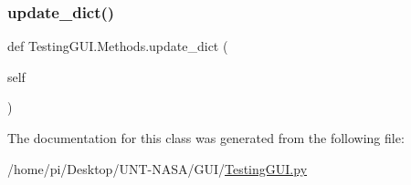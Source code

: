 \mbox{\label{classTestingGUI_1_1Methods_a0709231f5f6f33c59ce325c7e3ebf156}} 
\subsubsection{\texorpdfstring{update\+\_\+dict()}{update\_dict()}\hspace{0.1cm}{\footnotesize\ttfamily [2/2]}}
{\footnotesize\ttfamily def Testing\+G\+U\+I.\+Methods.\+update\+\_\+dict (\begin{DoxyParamCaption}\item[{}]{self }\end{DoxyParamCaption})}



The documentation for this class was generated from the following file\+:\begin{DoxyCompactItemize}
\item 
/home/pi/\+Desktop/\+U\+N\+T-\/\+N\+A\+S\+A/\+G\+U\+I/\hyperlink{GUI_2TestingGUI_8py}{Testing\+G\+U\+I.\+py}\end{DoxyCompactItemize}

